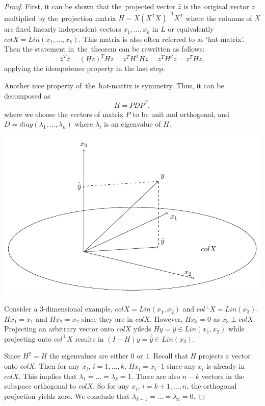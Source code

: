 \begin{proof}
First, it can be shown that the~projected vector $\hat z$ is the~original vector $z$
multiplied by the~projection matrix $H = X(X^T X)^{-1}X^T$ where the columns of $X$
are fixed linearly independent vectors $x_1, \ldots, x_k$ in $L$
or equivalently $colX = Lin(x_1, \ldots, x_k)$.
This matrix is  also often referred to as `hat-matrix'.
Then the statement in~the~theorem can be rewritten as follows:
\[
\hat z^T \hat z = (Hz)^T Hz = z^T H^T H z = z^T H^2 z = z^T H z,
\]
applying the idempotence property in the last step.

Another nice property of~the~hat-mattix is symmetry.
Thus, it can be decomposed as
\[
H = P D P^T,
\]
where we choose the vectors of matrix $P$ to be unit and orthogonal,
and $D = diag{(\lambda_1, \ldots, \lambda_n)}$ where $\lambda_i$ is an eigenvalue of $H$.

\begin{marginfigure}
  \includegraphics[width=\linewidth]{figures/04_chi_squared_example.pdf}
  \caption{Consider a $3$-dimensional example, $colX = Lin(x_1, x_2)$ and $col^{\perp}X = Lin(x_3)$.
  $H x_1 = x_1$ and $H x_2 = x_2$ since they are in $colX$. However, $H x_3 = 0$ as $x_3 \perp colX$.
  Projecting an arbitrary vector onto $colX$ yileds $Hy = \hat y \in Lin(x_1, x_2)$
  while projecting onto $col^{\perp}X$ results in $(I-H)y = \hat{\hat y} \in Lin(x_3)$.}
\end{marginfigure}

Since $H^2 = H$ the eigenvalues are either $0$ or $1$.
Recall that $H$ projects a vector onto $colX$.
Then for any $x_i$, $i = 1, \ldots, k$, $H x_i = x_i \cdot 1$ since
any $x_i$ is already in $colX$. This implies that $\lambda_1 = \ldots = \lambda_k = 1$.
There are also $n-k$ vectors in the subspace orthogonal to $colX$.
So for any $x_i$, $i= k+1, \ldots, n$, the orthogonal projection yields zero.
We conclude that $\lambda_{k+1} = \ldots = \lambda_n = 0$.


\end{proof}
